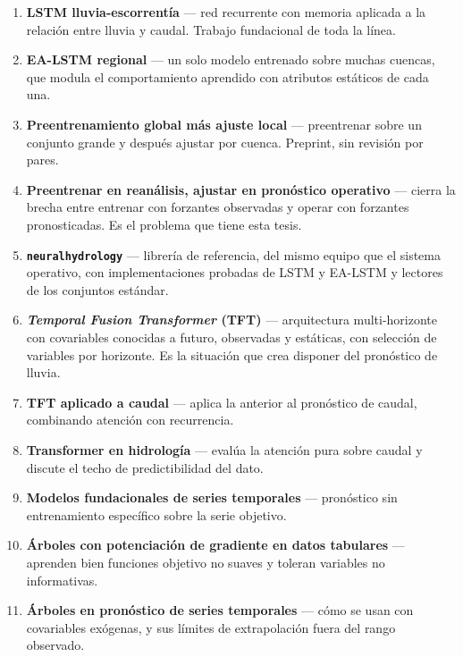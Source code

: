 \documentclass{../comun/tesisuba}
\newcommand{\entrada}[2]{\item \textbf{#1} --- #2}
\begin{document}
\begin{enumerate}[leftmargin=*, itemsep=3pt]

\entrada{LSTM lluvia-escorrentía}{red recurrente con memoria aplicada a la relación entre lluvia y
caudal. Trabajo fundacional de toda la línea. \citet{kratzert-2018-lstm-lluvia-escorrentia}}

\entrada{EA-LSTM regional}{un solo modelo entrenado sobre muchas cuencas, que modula el
comportamiento aprendido con atributos estáticos de cada una.
\citet{kratzert-2019-universal-regional-local}}

\entrada{Preentrenamiento global más ajuste local}{preentrenar sobre un conjunto grande y después
ajustar por cuenca. Preprint, sin revisión por pares. \citet{ryd-2025-fine-tuning-local}}

\entrada{Preentrenar en reanálisis, ajustar en pronóstico operativo}{cierra la brecha entre
entrenar con forzantes observadas y operar con forzantes pronosticadas. Es el problema que tiene
esta tesis. \citet{taccari-2026-aifl}}

\entrada{\texttt{neuralhydrology}}{librería de referencia, del mismo equipo que el sistema
operativo, con implementaciones probadas de LSTM y EA-LSTM y lectores de los conjuntos estándar.
\citet{kratzert-2022-neuralhydrology}}

\entrada{\textit{Temporal Fusion Transformer} (TFT)}{arquitectura multi-horizonte con covariables
conocidas a futuro, observadas y estáticas, con selección de variables por horizonte. Es la
situación que crea disponer del pronóstico de lluvia. \citet{lim-2021-tft}}

\entrada{TFT aplicado a caudal}{aplica la anterior al pronóstico de caudal, combinando atención
con recurrencia. \citet{rasiyakoya-2024-tft-caudal}}

\entrada{Transformer en hidrología}{evalúa la atención pura sobre caudal y discute el techo de
predictibilidad del dato. \citet{liu-2024-transformer-limite-hidrologico}}

\entrada{Modelos fundacionales de series temporales}{pronóstico sin entrenamiento específico sobre
la serie objetivo. \citet{sun-2026-tsfm-zeroshot-caudal}}

\entrada{Árboles con potenciación de gradiente en datos tabulares}{aprenden bien funciones
objetivo no suaves y toleran variables no informativas.
\citet{grinsztajn-2022-arboles-tabular}}

\entrada{Árboles en pronóstico de series temporales}{cómo se usan con covariables exógenas, y sus
límites de extrapolación fuera del rango observado.
\citet{januschowski-2022-forecasting-trees, makridakis-2022-m5-accuracy}}


\end{enumerate}
\end{document}
